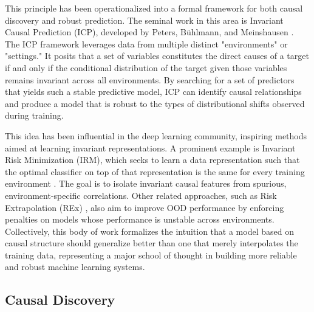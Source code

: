 {This principle has been operationalized into a formal framework for both causal discovery and robust prediction. The seminal work in this area is Invariant Causal Prediction (ICP), developed by Peters, Bühlmann, and Meinshausen \cite{peters2016invariant}. The ICP framework leverages data from multiple distinct "environments" or "settings." It posits that a set of variables constitutes the direct causes of a target if and only if the conditional distribution of the target given those variables remains invariant across all environments. By searching for a set of predictors that yields such a stable predictive model, ICP can identify causal relationships and produce a model that is robust to the types of distributional shifts observed during training.

This idea has been influential in the deep learning community, inspiring methods aimed at learning invariant representations. A prominent example is Invariant Risk Minimization (IRM), which seeks to learn a data representation such that the optimal classifier on top of that representation is the same for every training environment \cite{arjovsky2019invariant}. The goal is to isolate invariant causal features from spurious, environment-specific correlations. Other related approaches, such as Risk Extrapolation (REx) \cite{krueger2021out}, also aim to improve OOD performance by enforcing penalties on models whose performance is unstable across environments. Collectively, this body of work formalizes the intuition that a model based on causal structure should generalize better than one that merely interpolates the training data, representing a major school of thought in building more reliable and robust machine learning systems.

\newpage

\subsection{Causal Discovery}

}
